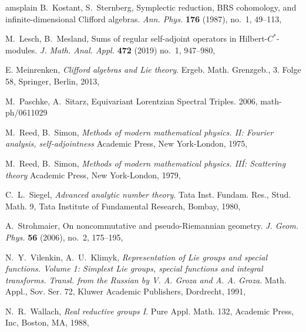\documentclass{amsart}
\theoremstyle{definition}
\theoremstyle{remark}
\numberwithin{equation}{section}
\begin{document}
\begin{thebibliography}{amsplain}
B.~Kostant, S.~Sternberg, Symplectic reduction, BRS cohomology, and infinite-dimensional Clifford algebras.
\emph{Ann. Phys.} \textbf{176} (1987), no.~1, 49--113,

M.~Lesch, B.~Mesland, Sums of regular self-adjoint operators in Hilbert-\(C^*\)-modules.
\emph{J. Math. Anal. Appl.} \textbf{472} (2019) no.~1, 947--980,

E. Meinrenken, \emph{Clifford algebras and Lie theory}.
Ergeb. Math. Grenzgeb., 3. Folge 58, Springer, Berlin, 2013,

M.~Paschke, A.~Sitarz, Equivariant Lorentzian Spectral Triples.
2006, math-ph/0611029

M.~Reed, B.~Simon, \emph{Methods of modern mathematical physics. II: Fourier analysis, self-adjointness}
Academic Press, New York-London, 1975,

M.~Reed, B.~Simon, \emph{Methods of modern mathematical physics. IIÍ: Scattering theory}
Academic Press, New York-London, 1979,

C.~L.~Siegel, \emph{Advanced analytic number theory}.
Tata Inst. Fundam. Res., Stud. Math. 9, Tata Institute of Fundamental Research, Bombay, 1980,

A.~Strohmaier, On noncommutative and pseudo-Riemannian geometry.
\emph{J. Geom. Phys.} \textbf{56} (2006), no.~2, 175--195,

N.~Y.~Vilenkin, A.~U.~Klimyk, \emph{Representation of Lie groups and special functions. Volume 1: Simplest Lie groups, special functions and integral transforms. Transl. from the Russian by V. A. Groza and A. A. Groza}.
Math. Appl., Sov. Ser. 72, Kluwer Academic Publishers, Dordrecht, 1991,

N.~R.~Wallach, \emph{Real reductive groups I}.
Pure Appl. Math. 132, Academic Press, Inc, Boston, MA, 1988,




\end{thebibliography}
\end{document}

